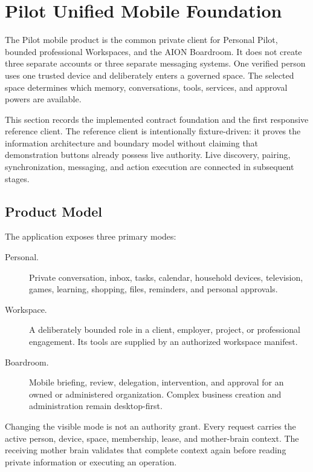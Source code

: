 \section{Pilot Unified Mobile Foundation}
\label{sec:pilot-unified-mobile-foundation}

The Pilot mobile product is the common private client for Personal Pilot, bounded
professional Workspaces, and the AION Boardroom.  It does not create three separate
accounts or three separate messaging systems.  One verified person uses one trusted
device and deliberately enters a governed space.  The selected space determines which
memory, conversations, tools, services, and approval powers are available.

This section records the implemented contract foundation and the first responsive
reference client.  The reference client is intentionally fixture-driven: it proves the
information architecture and boundary model without claiming that demonstration buttons
already possess live authority.  Live discovery, pairing, synchronization, messaging,
and action execution are connected in subsequent stages.

\subsection{Product Model}

The application exposes three primary modes:

\begin{description}
  \item[Personal.] Private conversation, inbox, tasks, calendar, household devices,
  television, games, learning, shopping, files, reminders, and personal approvals.
  \item[Workspace.] A deliberately bounded role in a client, employer, project, or
  professional engagement.  Its tools are supplied by an authorized workspace manifest.
  \item[Boardroom.] Mobile briefing, review, delegation, intervention, and approval for
  an owned or administered organization.  Complex business creation and administration
  remain desktop-first.
\end{description}

Changing the visible mode is not an authority grant.  Every request carries the active
person, device, space, membership, lease, and mother-brain context.  The receiving mother
brain validates that complete context again before reading private information or
executing an operation.

